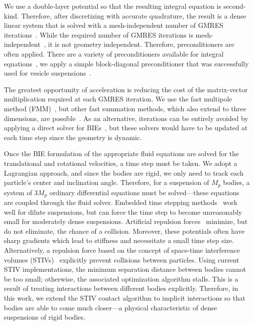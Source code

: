 \documentclass[preprint, 10pt]{elsarticle}
\begin{document}
We use a double-layer potential so that the resulting integral equation
is second-kind.  Therefore, after discretizing with accurate quadrature,
the result is a dense linear system that is solved with a
mesh-independent number of GMRES iterations~\cite{Saad1986}.  While the
required number of GMRES iterations is
mesh-independent~\cite{Campbell1996}, it is not geometry independent.
Therefore, preconditioners are often applied.  There are a variety of
preconditioners available for integral equations~\cite{cou-pou-dar2017,
che2000, qua-cou-dar2018, Quaife2015a, bra-lub1990, hem-sch1981}, we
apply a simple block-diagonal preconditioner that was successfully used
for vesicle suspensions~\cite{Quaife2014}.

The greatest opportunity of acceleration is reducing the cost of the
matrix-vector multiplication required at each GMRES iteration.  We use
the fast multipole method (FMM)~\cite{Greengard1987,Greenbaum1992},
but other fast summation methods, which also extend to three dimensions,
are possible~\cite{bar-hut1986, kli-tor2014}.  As an alternative,
iterations can be entirely avoided by applying a direct solver for
BIEs~\cite{mar-bar-gil-vee2016}, but these solvers would have to be
updated at each time step since the geometry is dynamic.

Once the BIE formulation of the appropriate fluid equations are solved
for the translational and rotational velocities, a time step must be
taken.  We adopt a Lagrangian approach, and since the bodies are rigid,
we only need to track each particle's center and inclination angle.
Therefore, for a suspension of $M_p$ bodies, a system of $3M_p$ ordinary
differential equations must be solved---these equations are coupled
through the fluid solver.  Embedded time stepping
methods~\cite{kli-tor2014} work well for dilute suspensions, but can
force the time step to become unreasonably small for moderately dense
suspensions. Artificial repulsion forces~\cite{Flormann2017, Liu2006,
Malhotra2018, Lu2017, Kabacogulu2017} minimize, but do not eliminate,
the chance of a collision. Moreover, these potentials often have sharp
gradients which lead to stiffness and necessitate a small time step
size. Alternatively, a repulsion force based on the concept of
space-time interference volumes (STIVs)~\cite{Harmon2011, Lu2017}
explicitly prevent collisions between particles.  Using current STIV
implementations, the minimum separation distance between bodies cannot
be too small; otherwise, the associated optimization algorithm stalls.
This is a result of treating interactions between different bodies
explicitly.  Therefore, in this work, we extend the STIV contact
algorithm to implicit interactions so that bodies are able to come much
closer---a physical characteristic of dense suspensions of rigid bodies.
\end{document}
